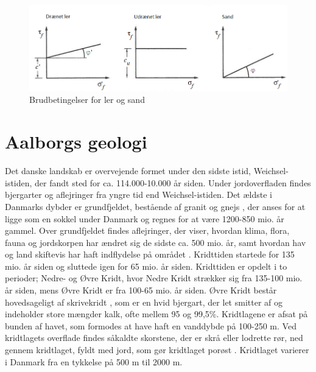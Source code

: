 \begin{figure}[htbp]
	\centering
	\includegraphics[width=1.0\textwidth]{billeder/friktionsvinkeller.png}
	\caption{Brudbetingelser for ler og sand \citep{geoteknik}}
	\label{fig:friktionsvinkler}
\end{figure}

\section{Aalborgs geologi}
Det danske landskab er overvejende formet under den sidste istid, Weichsel-istiden, der fandt sted for ca. 114.000-10.000 år siden. Under jordoverfladen findes bjergarter og aflejringer fra yngre tid end Weichsel-istiden. Det ældste i Danmarks dybder er grundfjeldet, bestående af granit og gnejs \citep{geopdf}, der anses for at ligge som en sokkel under Danmark og regnes for at være 1200-850 mio. år gammel. Over grundfjeldet findes aflejringer, der viser, hvordan klima, flora, fauna og jordskorpen har ændret sig de sidste ca. 500 mio. år, samt hvordan hav og land skiftevis har haft indflydelse på området \citep{geolink}.
\newline
\newline
Kridttiden startede for 135 mio. år siden og sluttede igen for 65 mio. år siden. Kridttiden er opdelt i to perioder; Nedre- og Øvre Kridt, hvor Nedre Kridt strækker sig fra 135-100 mio. år siden, mens Øvre Kridt er fra 100-65 mio. år siden.  Øvre Kridt består hovedsageligt af skrivekridt \citep{geopdf}, som er en hvid bjergart, der let smitter af og indeholder store mængder kalk, ofte mellem 95 og 99,5\%. Kridtlagene er afsat på bunden af havet, som formodes at have haft en vanddybde på 100-250 m. Ved kridtlagets overflade findes såkaldte skorstene, der er skrå eller lodrette rør, ned gennem kridtlaget, fyldt med jord, som gør kridtlaget porøst \citep[ s. 15-16]{geobog}. Kridtlaget varierer i Danmark fra en tykkelse på 500 m til 2000 m.
\newline
\newline
